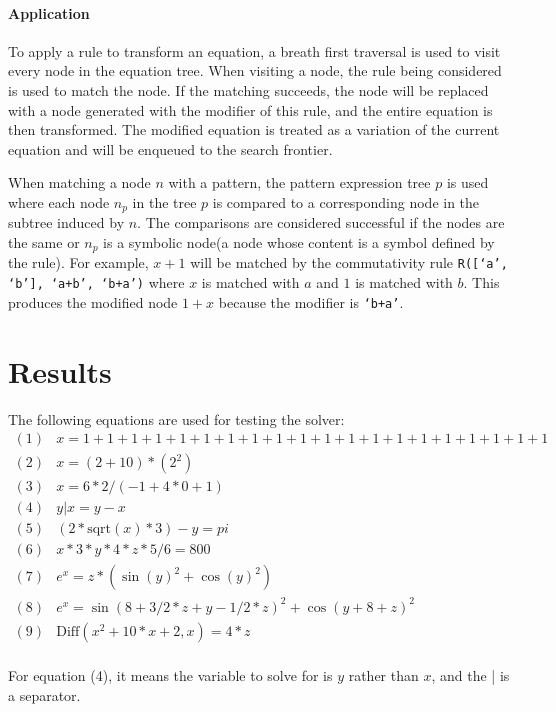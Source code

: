 \documentclass{article}
\begin{document}
\paragraph{Application} To apply a rule to transform an equation, a breath first traversal is used to visit every node in the equation tree. When visiting a node, the rule being considered is used to match the node. If the matching succeeds, the node will be replaced with a node generated with the modifier of this rule, and the entire equation is then transformed. The modified equation is treated as a variation of the current equation and will be enqueued to the search frontier.

When matching a node $n$ with a pattern, the pattern expression tree $p$ is used where each node $n_p$ in the tree $p$ is compared to a corresponding node in the subtree induced by $n$. The comparisons are considered successful if the nodes are the same or $n_p$ is a symbolic node(a node whose content is a symbol defined by the rule). For example, $x+1$ will be matched by the commutativity rule \texttt{R([`a', `b'], `a+b', `b+a')} where $x$ is matched with $a$ and $1$ is matched with $b$. This produces the modified node $1+x$ because the modifier is \texttt{`b+a'}.

\section{Results}
The following equations are used for testing the solver:
\begin{displaymath}
\begin{split}
(1)& x = 1 + 1 + 1 + 1 + 1 + 1 + 1 + 1 + 1 + 1 + 1 + 1 + 1 + 1 + 1 + 1 + 1 + 1 + 1 + 1\\
(2)& x = (2 + 10) * (2^2)\\
(3)& x = 6 * 2 / (-1 + 4 * 0 + 1)\\
(4)& y | x = y - x\\
(5)& (2 * \text{sqrt}(x) * 3) - y = pi\\
(6)& x * 3 * y * 4 * z * 5 / 6 = 800\\
(7)& e^x = z * (\sin(y)^2 + \cos(y)^2)\\
(8)& e^x = \sin(8 + 3/2 * z + y - 1/2 * z)^2 + \cos(y + 8 + z)^2\\
(9)& \text{Diff}(x^2 + 10 * x + 2, x) = 4 * z\\
\end{split}
\end{displaymath}

For equation (4), it means the variable to solve for is $y$ rather than $x$, and the | is a separator.
\end{document}
